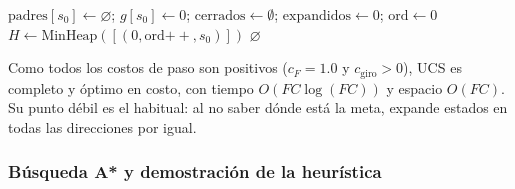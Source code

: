 \begin{algorithm}[H]
  \caption{Búsqueda de costo uniforme: UCS ()}
  \label{alg:ucs}
  $\text{padres}[s_0] \leftarrow \varnothing$; $g[s_0] \leftarrow 0$; $\text{cerrados} \leftarrow \emptyset$; $\text{expandidos} \leftarrow 0$; $\text{ord} \leftarrow 0$\;
  $H \leftarrow \text{MinHeap}([(0, \text{ord}{++}, s_0)])$\;
  \Return $\varnothing$\;
\end{algorithm}

Como todos los costos de paso son positivos ($c_F = 1.0$ y $c_{\text{giro}} > 0$), UCS es completo y óptimo en costo, con tiempo $O(FC\log(FC))$ y espacio $O(FC)$. Su punto débil es el habitual: al no saber dónde está la meta, expande estados en todas las direcciones por igual.

\subsubsection{Búsqueda A* y demostración de la heurística}

